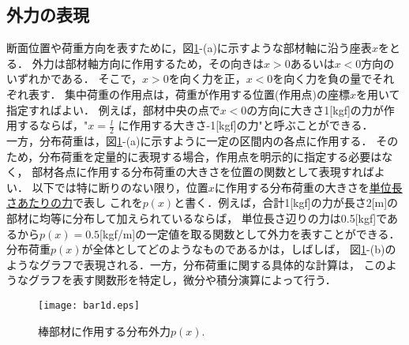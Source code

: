 \documentclass[10pt,a4j]{jbook}
\begin{document}
\subsection{外力の表現}
\hspace{\parindent}
断面位置や荷重方向を表すために，図\ref{fig:fig0}-(a)に示すような部材軸に沿う座表$x$をとる．
外力は部材軸方向に作用するため，その向きは$x>0$あるいは$x<0$方向のいずれかである．
そこで，$x>0$を向く力を正，$x<0$を向く力を負の量でそれぞれ表す．
集中荷重の作用点は，荷重が作用する位置(作用点)の座標$x$を用いて指定すればよい．
例えば，部材中央の点で$x<0$の方向に大きさ1[kgf]の力が作用するならば，"$x=\frac{l}{2}$
に作用する大きさ-1[kgf]の力"と呼ぶことができる．\\
一方，分布荷重は，図\ref{fig:fig0}-(a)に示すように一定の区間内の各点に作用する．
そのため，分布荷重を定量的に表現する場合，作用点を明示的に指定する必要はなく，
部材各点に作用する分布荷重の大きさを位置の関数として表現すればよい．
以下では特に断りのない限り，位置$x$に作用する分布荷重の大きさを\underline{単位長さあたりの力}で表し
これを$p(x)$と書く．例えば，合計1[kgf]の力が長さ2[m]の部材に均等に分布して加えられているならば，
単位長さ辺りの力は0.5[kgf]であるから$p(x)=0.5$[kgf/m]の一定値を取る関数として外力を表すことができる．
分布荷重$p(x)$が全体としてどのようなものであるかは，しばしば，
図\ref{fig:fig0}-(b)のようなグラフで表現される．一方，分布荷重に関する具体的な計算は，
このようなグラフを表す関数形を特定し，微分や積分演算によって行う．
\begin{figure}[h]
	\begin{center}
	\texttt{[image: bar1d.eps]} 
	\end{center}
	\caption{棒部材に作用する分布外力$p(x)$.} 
	\label{fig:fig0}
\end{figure}
\end{document}
